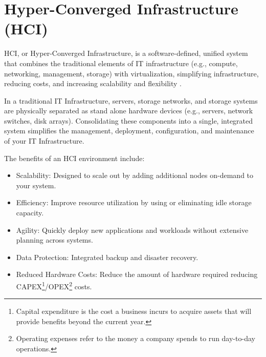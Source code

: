 \section{Hyper-Converged Infrastructure (HCI)} \label{section: HCI}

HCI, or Hyper-Converged Infrastructure, is a software-defined, unified system that combines the traditional elements of IT infrastructure (e.g., compute, networking, management, storage) with virtualization, simplifying infrastructure, reducing costs, and increasing scalability and flexibility \cite{article}. 

In a traditional IT Infrastructure, servers, storage networks, and storage systems are physically separated as stand alone hardware devices (e.g., servers, network switches, disk arrays). Consolidating these components into a single, integrated system simplifies the management, deployment, configuration, and maintenance of your IT Infrastructure. 

The benefits of an HCI environment include: 
\begin{itemize}
    \item Scalability: Designed to scale out by adding additional nodes on-demand to your system.
    \item Efficiency: Improve resource utilization by using or eliminating idle storage capacity.
    \item Agility: Quickly deploy new applications and workloads without extensive planning across systems. 
    \item Data Protection: Integrated backup and disaster recovery.
    \item Reduced Hardware Costs: Reduce the amount of hardware required reducing CAPEX\footnote{Capital expenditure is the cost a business incurs to acquire assets that will provide benefits beyond the current year.}/OPEX\footnote{Operating expenses refer to the money a company spends to run day-to-day operations.} costs. 
\end{itemize}


